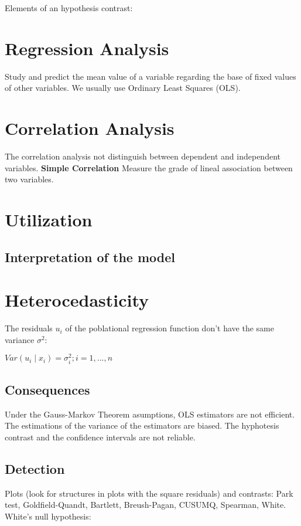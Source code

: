 \documentclass[10pt,landscape]{article}
\begin{document}
\begin{multicols}{3}
Elements of an hypothesis contrast:












\section*{Regression Analysis}
Study and predict the mean value of a variable regarding the base of fixed values of other variables.
We usually use Ordinary Least Squares (OLS).

\section*{Correlation Analysis}
The correlation analysis not distinguish between dependent and independent variables.
\textbf{Simple Correlation}
Measure the grade of lineal association between two variables.

\section*{Utilization}
\subsection*{Interpretation of the model}


\section*{Heterocedasticity}
The residuals $u_i$ of the poblational regression function don't have the same variance $\sigma^2$:

$Var(u_i \mid x_i) = \sigma_i^2; i = 1, ..., n$

\subsection*{Consequences}
Under the Gauss-Markov Theorem asumptions, OLS estimators are not efficient. The estimations of the variance of the estimators are biased. The hyphotesis contrast and the confidence intervals are not reliable.
\subsection*{Detection}
Plots (look for structures in plots with the square residuals) and contrasts: Park test, Goldfield-Quandt, Bartlett, Breush-Pagan, CUSUMQ, Spearman, White.
White's null hypothesis:


\end{multicols}
\end{document}
